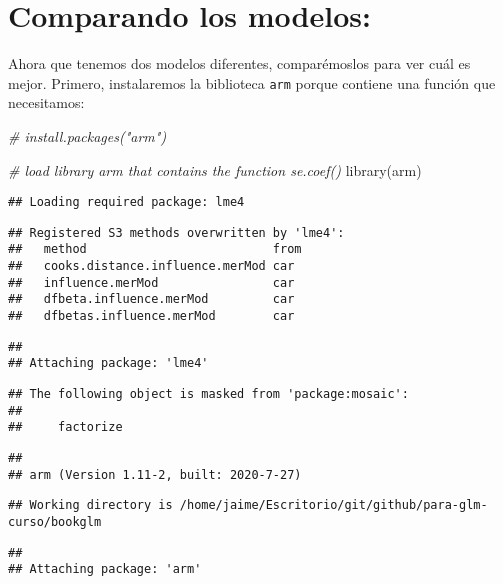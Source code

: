 \documentclass[
]{book}
\newenvironment{Shaded}{\begin{snugshade}}{\end{snugshade}}
\newcommand{\CommentTok}[1]{\textcolor[rgb]{0.56,0.35,0.01}{\textit{#1}}}
\newcommand{\FunctionTok}[1]{\textcolor[rgb]{0.00,0.00,0.00}{#1}}
\newcommand{\NormalTok}[1]{#1}
\begin{document}
\hypertarget{comparando-los-modelos}{%
\section{Comparando los modelos:}\label{comparando-los-modelos}}

Ahora que tenemos dos modelos diferentes, comparémoslos para ver cuál es mejor. Primero, instalaremos la biblioteca \texttt{arm} porque contiene una función que necesitamos:

\begin{Shaded}
\begin{Highlighting}[]
\CommentTok{\# install.packages("arm")}

\CommentTok{\# load library arm that contains the function se.coef()}
\FunctionTok{library}\NormalTok{(arm)}
\end{Highlighting}
\end{Shaded}

\begin{verbatim}
## Loading required package: lme4
\end{verbatim}

\begin{verbatim}
## Registered S3 methods overwritten by 'lme4':
##   method                          from
##   cooks.distance.influence.merMod car 
##   influence.merMod                car 
##   dfbeta.influence.merMod         car 
##   dfbetas.influence.merMod        car
\end{verbatim}

\begin{verbatim}
## 
## Attaching package: 'lme4'
\end{verbatim}

\begin{verbatim}
## The following object is masked from 'package:mosaic':
## 
##     factorize
\end{verbatim}

\begin{verbatim}
## 
## arm (Version 1.11-2, built: 2020-7-27)
\end{verbatim}

\begin{verbatim}
## Working directory is /home/jaime/Escritorio/git/github/para-glm-curso/bookglm
\end{verbatim}

\begin{verbatim}
## 
## Attaching package: 'arm'
\end{verbatim}
\end{document}
